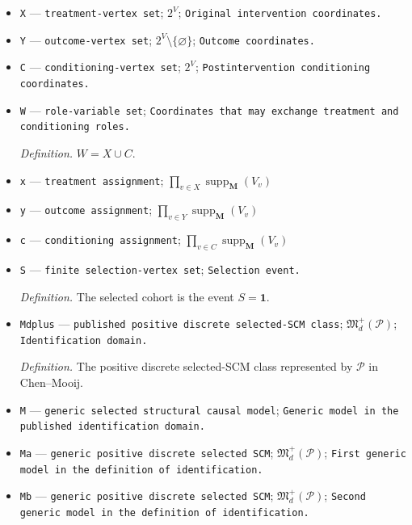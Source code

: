 \documentclass{article}
\begin{document}
\begin{itemize}
  \par\smallskip\noindent\emph{Definition.} \(\mathfrak B(\mathcal P)=(B_1,\ldots,B_{m_{\mathfrak B}})\) is a fixed deterministic ordering of the buckets of \(\mathcal P\).
  \item \texttt{X} --- \texttt{treatment-\allowbreak{}vertex set}; \(2^V\); \texttt{Original intervention coordinates.}
  \item \texttt{Y} --- \texttt{outcome-\allowbreak{}vertex set}; \(2^V\setminus\{\varnothing\}\); \texttt{Outcome coordinates.}
  \item \texttt{C} --- \texttt{conditioning-\allowbreak{}vertex set}; \(2^V\); \texttt{Postintervention conditioning coordinates.}
  \item \texttt{W} --- \texttt{role-\allowbreak{}variable set}; \texttt{Coordinates that may exchange treatment and conditioning roles.}
  \par\smallskip\noindent\emph{Definition.} \(W=X\cup C\).
  \item \texttt{x} --- \texttt{treatment assignment}; \(\prod_{v\in X}\operatorname{supp}_{\mathbf M}(V_v)\)
  \item \texttt{y} --- \texttt{outcome assignment}; \(\prod_{v\in Y}\operatorname{supp}_{\mathbf M}(V_v)\)
  \item \texttt{c} --- \texttt{conditioning assignment}; \(\prod_{v\in C}\operatorname{supp}_{\mathbf M}(V_v)\)
  \item \texttt{S} --- \texttt{finite selection-\allowbreak{}vertex set}; \texttt{Selection event.}
  \par\smallskip\noindent\emph{Definition.} The selected cohort is the event \(S=\mathbf 1\).
  \item \texttt{Mdplus} --- \texttt{published positive discrete selected-\allowbreak{}SCM class}; \(\mathfrak M_d^+(\mathcal P)\); \texttt{Identification domain.}
  \par\smallskip\noindent\emph{Definition.} The positive discrete selected-SCM class represented by \(\mathcal P\) in Chen--Mooij.
  \item \texttt{M} --- \texttt{generic selected structural causal model}; \texttt{Generic model in the published identification domain.}
  \item \texttt{Ma} --- \texttt{generic positive discrete selected SCM}; \(\mathfrak M_d^+(\mathcal P)\); \texttt{First generic model in the definition of identification.}
  \item \texttt{Mb} --- \texttt{generic positive discrete selected SCM}; \(\mathfrak M_d^+(\mathcal P)\); \texttt{Second generic model in the definition of identification.}

\end{itemize}
\end{document}
